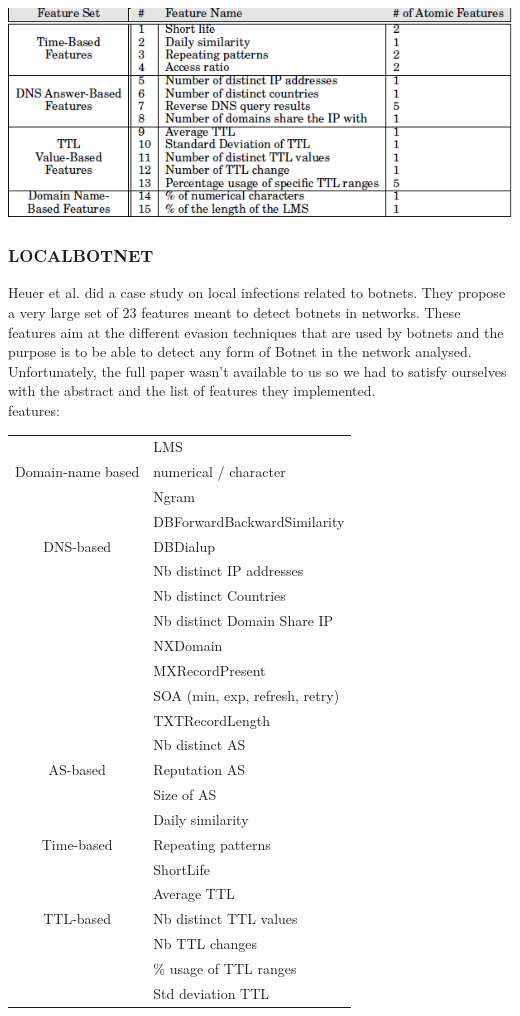 \includegraphics[scale=.8]{img/exposure_features.png}

\subsubsection{LOCALBOTNET}
Heuer et al.\cite{localbotnet} did a case study on local infections related to botnets. They propose a very large set of 23 features meant to detect botnets in networks. These features aim at the different evasion techniques that are used by botnets and the purpose is to be able to detect any form of Botnet in the network analysed. Unfortunately, the full paper wasn't available to us so we had to satisfy ourselves with the abstract and the list of features they implemented.\\
features:
\begin{tabular}{c|l}
\hline
 & LMS\\
Domain-name based & numerical / character\\
& Ngram\\
\hline
 & DBForwardBackwardSimilarity\\
DNS-based & DBDialup\\
& Nb distinct IP addresses\\
& Nb distinct Countries\\
& Nb distinct Domain Share IP\\
& NXDomain\\
& MXRecordPresent\\
& SOA (min, exp, refresh, retry)\\
& TXTRecordLength\\
\hline
 & Nb distinct AS\\
AS-based & Reputation AS\\
& Size of AS\\
\hline
 & Daily similarity\\
Time-based & Repeating patterns\\
& ShortLife\\
\hline
 & Average TTL\\
TTL-based & Nb distinct TTL values\\
& Nb TTL changes\\
& \% usage of TTL ranges\\
& Std deviation TTL\\
\end{tabular}

